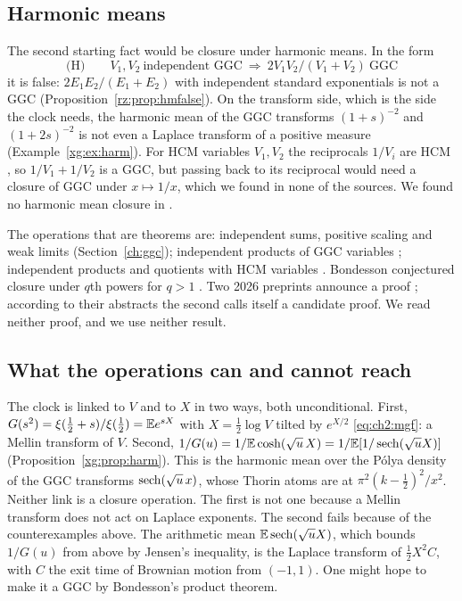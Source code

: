 \subsection{Harmonic means}

The second starting fact would be closure under harmonic means. In the form
\[
\text{(H)}\qquad V_1,V_2\ \text{independent GGC}\ \Longrightarrow\ 2V_1V_2/(V_1+V_2)\ \text{GGC}
\]
it is false: $2E_1E_2/(E_1+E_2)$ with independent standard exponentials is not a GGC (Proposition~\ref{rz:prop:hmfalse}). On the transform side, which is the side the clock needs, the harmonic mean of the GGC transforms $(1+s)^{-2}$ and $(1+2s)^{-2}$ is not even a Laplace transform of a positive measure (Example~\ref{xg:ex:harm}). For HCM variables $V_1,V_2$ the reciprocals $1/V_i$ are HCM \cite{NCJedidiSimon13}, so $1/V_1+1/V_2$ is a GGC, but passing back to its reciprocal would need a closure of GGC under $x\mapsto1/x$, which we found in none of the sources. We found no harmonic mean closure in \cite{NCJedidiSimon13,NCSjodin19,NCSjodin26,Bond2015}.

The operations that are theorems are: independent sums, positive scaling and weak limits (Section~\ref{ch:ggc}); independent products of GGC variables \cite{Bond2015}; independent products and quotients with HCM variables \cite{Bondesson,NCJedidiSimon13}. Bondesson conjectured closure under $q$th powers for $q>1$ \cite{Bondesson,NCWangYin26}. Two 2026 preprints announce a proof \cite{NCSjodin26,NCWangYin26}; according to their abstracts the second calls itself a candidate proof. We read neither proof, and we use neither result.

\subsection{What the operations can and cannot reach}

The clock is linked to $V$ and to $X$ in two ways, both unconditional. First, $G(s^2)=\xi(\frac12+s)/\xi(\frac12)=\mathbb{E} e^{sX}$ with $X=\frac12\log V$ tilted by $e^{X/2}$ \eqref{eq:ch2:mgf}: a Mellin transform of $V$. Second, $1/G(u)=1/\mathbb{E}\cosh(\sqrt u\,X)=1/\mathbb{E}[1/\operatorname{sech}(\sqrt uX)]$ (Proposition~\ref{xg:prop:harm}). This is the harmonic mean over the P\'olya density of the GGC transforms $\operatorname{sech}(\sqrt u\,x)$, whose Thorin atoms are at $\pi^2(k-\frac12)^2/x^2$. Neither link is a closure operation. The first is not one because a Mellin transform does not act on Laplace exponents. The second fails because of the counterexamples above. The arithmetic mean $\mathbb{E}\operatorname{sech}(\sqrt uX)$, which bounds $1/G(u)$ from above by Jensen's inequality, is the Laplace transform of $\frac12X^2C$, with $C$ the exit time of Brownian motion from $(-1,1)$. One might hope to make it a GGC by Bondesson's product theorem.

